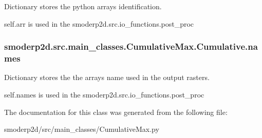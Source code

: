 Dictionary stores the python arrays identification. 

self.\-arr is used in the smoderp2d.\-src.\-io\-\_\-functions.\-post\-\_\-proc \hypertarget{classsmoderp2d_1_1src_1_1main__classes_1_1CumulativeMax_1_1Cumulative_a5c371c6f6e52bbd3ac4545f7bbe87bd3}{
\subsubsection[{names}]{\setlength{\rightskip}{0pt plus 5cm}smoderp2d.\-src.\-main\-\_\-classes.\-Cumulative\-Max.\-Cumulative.\-names}}\label{classsmoderp2d_1_1src_1_1main__classes_1_1CumulativeMax_1_1Cumulative_a5c371c6f6e52bbd3ac4545f7bbe87bd3}


Dictionary stores the the arrays name used in the output rasters. 

self.\-names is used in the smoderp2d.\-src.\-io\-\_\-functions.\-post\-\_\-proc 

The documentation for this class was generated from the following file\-:\begin{DoxyCompactItemize}
\item 
smoderp2d/src/main\-\_\-classes/Cumulative\-Max.\-py\end{DoxyCompactItemize}

